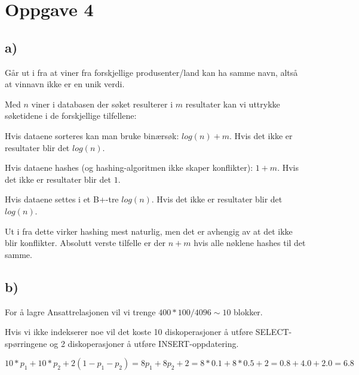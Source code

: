 \section{Oppgave 4}

\subsection{a)}


Går ut i fra at viner fra forskjellige produsenter/land kan ha samme navn, altså at vinnavn ikke er en unik verdi.

Med $n$ viner i databasen der søket resulterer i $m$ resultater kan vi uttrykke søketidene i de forskjellige tilfellene:

Hvis dataene sorteres kan man bruke binærsøk: $log(n) + m$. Hvis det ikke er resultater blir det $log(n)$.

Hvis dataene hashes (og hashing-algoritmen ikke skaper konflikter): $1 + m$. Hvis det ikke er resultater blir det $1$.

Hvis dataene settes i et B+-tre $log(n)$. Hvis det ikke er resultater blir det $log(n)$.

Ut i fra dette virker hashing mest naturlig, men det er avhengig av at det ikke blir konflikter. Absolutt verste tilfelle er der $n + m$ hvis alle nøklene hashes til det samme.

\subsection{b)}

For å lagre Ansattrelasjonen vil vi trenge $400 * 100 / 4096 \sim 10$ blokker.

Hvis vi ikke indekserer noe vil det koste 10 diskoperasjoner å utføre SELECT-spørringene og 2 diskoperasjoner å utføre INSERT-oppdatering. 

\[
    10*p_1 + 10*p_2 + 2(1 - p_1 - p_2) = 8p_1 + 8p_2 + 2 = 8*0.1 + 8*0.5 + 2 = 0.8 + 4.0 + 2.0 = 6.8
\]


